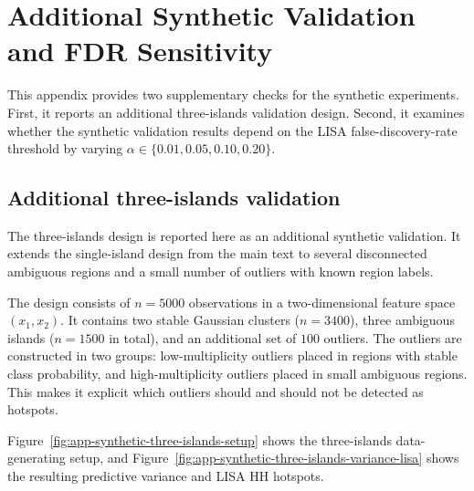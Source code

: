 \begin{table}[htbp]
\centering
\caption{Representative global HH rules on COMPAS.}
\label{tab:rules_compas_top_global}
\resizebox{\textwidth}{!}{

}
\end{table}

\begin{table}[htbp]
\centering
\caption{Feature frequency across global HH rules on COMPAS.}
\label{tab:rules_compas_features_global}

\end{table}

\FloatBarrier


\section{Additional Synthetic Validation and FDR Sensitivity}
\label{app:synthetic-fdr}

This appendix provides two supplementary checks for the synthetic experiments. First, it
reports an additional three-islands validation design. Second, it examines whether the
synthetic validation results depend on the LISA false-discovery-rate threshold by varying
$\alpha \in \{0.01, 0.05, 0.10, 0.20\}$.

\subsection*{Additional three-islands validation}

The three-islands design is reported here as an additional synthetic validation. It extends
the single-island design from the main text to several disconnected ambiguous regions
and a small number of outliers with known region labels.

The design consists of $n=5000$ observations in a two-dimensional feature space
$(x_1, x_2)$. It contains two stable Gaussian clusters ($n=3400$), three ambiguous
islands ($n=1500$ in total), and an additional set of $100$ outliers. The outliers are
constructed in two groups: low-multiplicity outliers placed in regions with stable class
probability, and high-multiplicity outliers placed in small ambiguous regions. This makes
it explicit which outliers should and should not be detected as hotspots.

Figure~\ref{fig:app-synthetic-three-islands-setup} shows the three-islands data-generating
setup, and Figure~\ref{fig:app-synthetic-three-islands-variance-lisa} shows the resulting
predictive variance and LISA HH hotspots.

